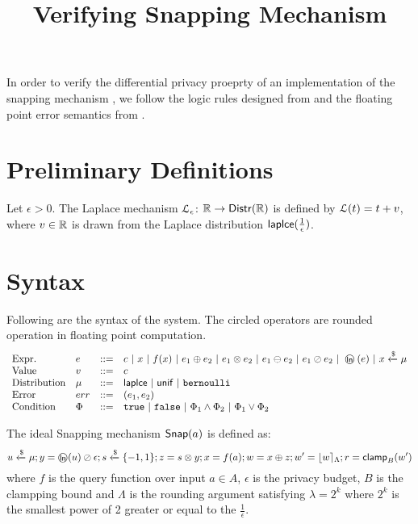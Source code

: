 \documentclass[a4paper,11pt]{article}
\begin{document}
\title{Verifying Snapping Mechanism}

\maketitle
In order to verify the differential privacy proeprty of an implementation of the snapping mechanism \cite{mironov2012significance}, we follow the logic rules designed from \cite{barthe2016proving} and the floating point error semantics from \cite{Ramananandro2016unified,Martel2006higher,Becker2018verified,Moscato2017Automatic}.

\section{Preliminary Definitions}
\begin{defn}
Let $\epsilon > 0$. The Laplace mechanism  $\mathcal{L}_{\epsilon}$: $\mathbb{R} \to \mathsf{Distr}(\mathbb{R})$ is defined by $\mathcal{L}(t) = t + v$, where $v \in \mathbb{R}$ is drawn from the Laplace distribution $\mathsf{laplce}(\frac{1}{\epsilon})$.
\end{defn}




\section{Syntax}
Following are the syntax of the system. The circled operators are rounded operation in floating point computation.
\[\begin{array}{llll}
\mbox{Expr.} & \expr & ::= & \econst ~|~ x ~|~ f(x) ~|~ \expr_1 \oplus \expr_2 ~|~ \expr_1 \otimes \expr_2 ~|~ \expr_1 \ominus \expr_2 ~|~ \expr_1 \oslash \expr_2 ~|~ \oln (\expr) ~|~ x \samplel \edistr \\
%
\mbox{Value} & \valr & ::= & \econst \\
%
\mbox{Distribution} & \edistr & ::= & \laplace ~|~ \uniform ~|~ \bernoulli \\ 
%
\mbox{Error} & \err & ::= & (\expr_1, \expr_2) \\

\mbox{Condition} & \condition & ::= & \etrue ~|~ \efalse ~|~ \condition_1 \land \condition_2 ~|~ \condition_1 \lor \condition_2

\end{array}\]


\begin{defn}
The ideal Snapping mechanism $\mathsf{Snap}( a)$ is defined as:
\[
	u \xleftarrow{\$} \edistr; y = \oln (u) \oslash \epsilon; s \samplel \{-1, 1\}; z = s \otimes y; x = f(a); w = x \oplus z; w' = \round{w}_{\Lambda}; r = \clamp_B (w')
\]
where $f$ is the query function over input $a \in A$, $\epsilon$ is the privacy budget, $B$ is the clampping bound and $\Lambda$ is the rounding argument satisfying $\lambda = 2^k$ where $2^k$ is the smallest power of 2 greater or equal to the $\frac{1}{\epsilon}$.
\end{defn}
\end{document}
